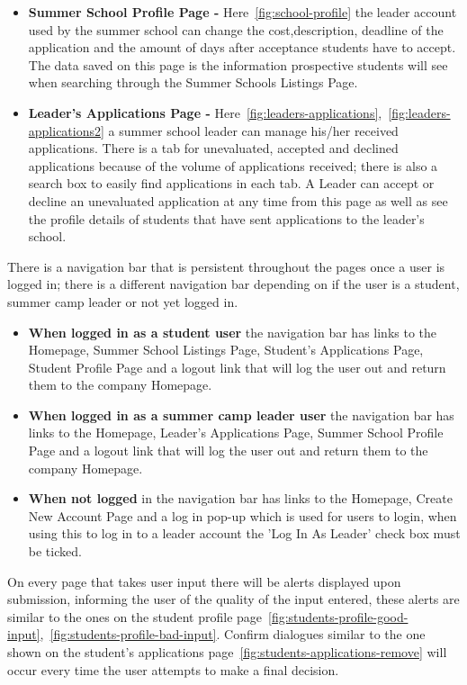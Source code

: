 \documentclass{project}
\begin{document}
\begin{itemize}
\item\textbf{Summer School Profile Page -}
Here~\ref{fig:school-profile} the leader account used by the summer school can change the cost,description, deadline of the application and the amount of days after acceptance students have to accept. The data saved on this page is the information prospective students will see when searching through the Summer Schools Listings Page.

\item\textbf{Leader's Applications Page -}
Here~\ref{fig:leaders-applications},~\ref{fig:leaders-applications2} a summer school leader can manage his/her received applications. There is a tab for unevaluated, accepted and declined applications because of the volume of applications received; there is also a search box to easily find applications in each tab. A Leader can accept or decline an unevaluated application at any time from this page as well as see the profile details of students that have sent applications to the leader's school.
\end{itemize}
There is a navigation bar that is persistent throughout the pages once a user is logged in; there is a different navigation bar depending on if the user is a student, summer camp leader or not yet logged in. 
\begin{itemize}
\item \textbf{When logged in as a student user} the navigation  bar has links to the Homepage,  Summer School Listings Page, Student's Applications Page, Student Profile Page and a logout link that will log the user out and return them to the company Homepage.

\item \textbf{When logged in as a summer camp leader user} the navigation bar has links to the Homepage,  Leader's Applications Page, Summer School Profile Page and a logout link that will log the user out and return them to the company Homepage.

\item \textbf{When not logged} in the navigation bar has links to the Homepage, Create New Account Page and a log in pop-up which is used for users to login, when using this to log in to a leader account the 'Log In As Leader' check box must be ticked.
\end{itemize}
On every page that takes user input there will be alerts displayed upon submission, informing the user of the quality of the input entered, these alerts are similar to the ones on the student profile page~\ref{fig:students-profile-good-input},~\ref{fig:students-profile-bad-input}. Confirm dialogues similar to the one shown on the student's applications page~\ref{fig:students-applications-remove} will occur every time the user attempts to make a final decision. 
\clearpage
\end{document}
